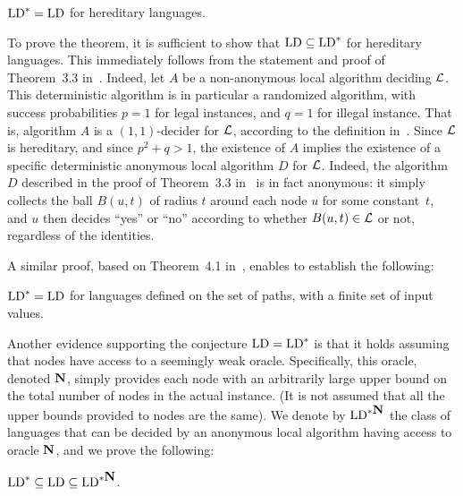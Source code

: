 \documentclass{llncs}
\newcommand{\LD}{\mbox{\rm LD}}
\newcommand{\up}{\mbox{\bf N}}
\def\cL{{\cal L}}
\begin{document}
\begin{theorem}\label{theo:LDhereditary}
$\LD^*=\LD$ for hereditary languages. 
\end{theorem}

To prove the theorem, it is sufficient to show that $\LD\subseteq \LD^*$ for hereditary languages. This immediately follows from the statement and proof of Theorem~3.3 in~\cite{FKP11}. Indeed, let $A$ be a non-anonymous local algorithm deciding $\cL$. This deterministic algorithm is in particular a randomized algorithm, with success probabilities $p=1$ for legal instances, and $q=1$ for illegal instance. That is, algorithm $A$ is a $(1,1)$-decider for $\cL$, according to the  definition in~\cite{FKP11}. Since $\cL$ is hereditary, and since $p^2+q>1$, the existence of $A$ implies the existence of a specific deterministic anonymous local algorithm $D$ for $\cL$. Indeed, the algorithm $D$ described in the proof of Theorem~3.3 in~\cite{FKP11}  is in fact anonymous: it simply collects the ball $B(u,t)$ of radius $t$ around each node $u$ for some constant~$t$, and $u$ then decides ``yes'' or ``no'' according to whether $B(u,t)\in\cL$ or not, regardless of the identities. 

A similar proof, based on Theorem~4.1 in~\cite{FKPP12}, enables to establish the following: 

\begin{theorem}\label{theo:LDpath}
$\LD^*=\LD$ for languages defined on the set of paths, with a finite set of input values. 
\end{theorem}

Another evidence supporting the conjecture $\LD=\LD^*$ is that it holds assuming that nodes have access to a seemingly weak oracle. Specifically, this oracle, denoted ${\up}$, simply provides each node with an arbitrarily large upper bound on the total number of nodes in the actual instance. 
(It is not assumed that all the upper bounds provided to nodes are the same). We denote by $\LD^{*\up}$ the class of languages that can be decided by an anonymous local algorithm having access to oracle $\up$, and we prove the following: 

\begin{theorem}\label{theo:LD=LD}
$\LD^*\subseteq\LD\subseteq\LD^{*\up}$.
\end{theorem}
\end{document}
